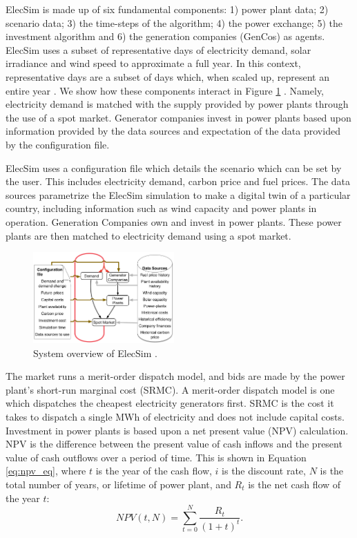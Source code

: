 \documentclass[final,3p,times,twocolumn,numbers]{elsarticle}
\begin{document}
ElecSim is made up of six fundamental components: 1) power plant data; 2) scenario data; 3) the time-steps of the algorithm; 4) the power exchange; 5) the investment algorithm and 6) the generation companies (GenCos) as agents. ElecSim uses a subset of representative days of electricity demand, solar irradiance and wind speed to approximate a full year. In this context, representative days are a subset of days which, when scaled up, represent an entire year \cite{Kell2020}. We show how these components interact in Figure \ref{fig:model_details} \cite{Kell}. Namely, electricity demand is matched with the supply provided by power plants through the use of a spot market. Generator companies invest in power plants based upon information provided by the data sources and expectation of the data provided by the configuration file. 



ElecSim uses a configuration file which details the scenario which can be set by the user. This includes electricity demand, carbon price and fuel prices. The data sources parametrize the ElecSim simulation to make a digital twin of a particular country, including information such as wind capacity and power plants in operation. Generation Companies own and invest in power plants. These power plants are then matched to electricity demand using a spot market.



\begin{figure}
    \includegraphics[width=0.48\textwidth,natwidth=610,natheight=400]{figures/methods/System_overview_large.png}
    \caption{System overview of ElecSim \cite{Kell}.}
    \label{fig:model_details}
\end{figure}


The market runs a merit-order dispatch model, and bids are made by the power plant's short-run marginal cost (SRMC). A merit-order dispatch model is one which dispatches the cheapest electricity generators first. SRMC is the cost it takes to dispatch a single MWh of electricity and does not include capital costs. Investment in power plants is based upon a net present value (NPV) calculation. NPV is the difference between the present value of cash inflows and the present value of cash outflows over a period of time. This is shown in Equation \ref{eq:npv_eq}, where $t$ is the year of the cash flow, $i$ is the discount rate, $N$ is the total number of years, or lifetime of power plant, and $R_t$ is the net cash flow of the year $t$:
\begin{equation} \label{eq:npv_eq}
NPV(t, N) = \sum_{t=0}^{N}\frac{R_t}{(1+t)^t}.
\end{equation}
\end{document}
